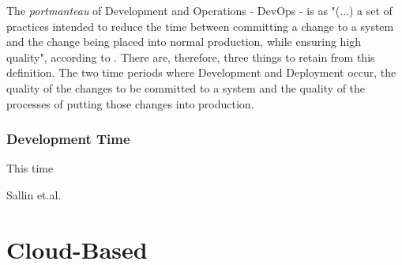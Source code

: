 The \textit{portmanteau} of Development and Operations - DevOps - is as "(...) a set of practices intended to reduce the time between committing a change to a system and the change being placed into normal production, while ensuring high quality", according to \parencite{bass_weber_zhu_2015}. There are, therefore, three things to retain from this definition. The two time periods where Development and Deployment occur, the quality of the changes to be committed to a system and the quality of the processes of putting those changes into production.

\subsubsection{Development Time}
This time 






Sallin et.al. \parencite{sallin_kropp_anslow_quilty_meier_2021}

\section{Cloud-Based}\label{state-of-the-art:s:cloud-based}